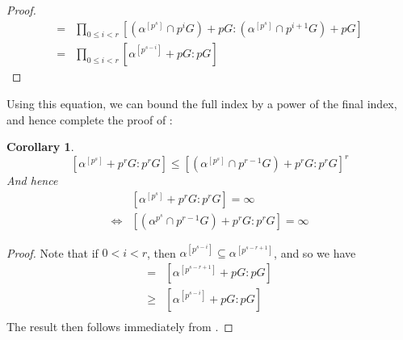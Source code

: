 \documentclass[a4paper,11pt]{article}
\newtheorem{corollary}[theorem]{Corollary}
\renewcommand{\iff}{\Longleftrightarrow}
\begin{document}
\begin{proof}
	\begin{align*}
		[\alpha^{[p^s]}+p^rG:p^rG] =& \prod\limits_{0\leq i< r}[(\alpha^{[p^s]}\cap p^iG)+pG:(\alpha^{[p^s]}\cap p^{i+1}G)+pG] \\
		=& \prod\limits_{0\leq i< r}[\alpha^{[p^{s-i}]}+pG:pG]
	\end{align*}
\end{proof}
\noindent Using this equation, we can bound the full index by a power of the final index, and hence complete the proof of :
\begin{corollary}\label{leftconvexnonconvexrelationship2}
	$$[\alpha^{[p^s]}+p^rG:p^rG] \leq [(\alpha^{[p^s]}\cap p^{r-1}G)+p^rG:p^rG]^r$$
	And hence
	\begin{align*}
		&[\alpha^{[p^s]}+p^rG:p^rG] =\infty \\
		\iff& [(\alpha^{p^s}\cap p^{r-1}G)+p^rG:p^rG] = \infty
	\end{align*}
\end{corollary}
\begin{proof}
	Note that if $0<i<r$, then $\alpha^{[p^{s-i}]}\subseteq \alpha^{[p^{s-r+1}]}$, and so we have
	\begin{align*}
		[(\alpha^{p^s}\cap p^{r-1}G)+p^rG:p^rG] =& [\alpha^{[p^{s-r+1}]}+pG:pG] \\
		\geq& [\alpha^{[p^{s-i}]}+pG:pG] \\
	\end{align*}
	The result then follows immediately from .
\end{proof}
\end{document}
